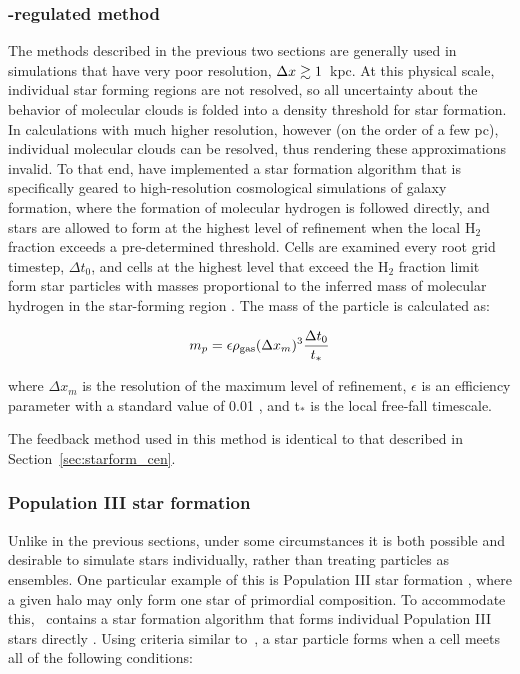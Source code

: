 \subsubsection{\HH-regulated method}
\label{sec:starform_H2reg}

The methods described in the previous two sections are generally used
in simulations that have very poor resolution, $\Delta x \gtrsim 1$~kpc.
At this physical scale, individual star forming regions are not
resolved, so all uncertainty about the behavior of molecular clouds is
folded into a density threshold for star formation.  In calculations
with much higher resolution, however (on the order of a few pc), individual
molecular clouds can be resolved, thus rendering these approximations
invalid.  To that end, \citet{2012ApJ...749...36K} have implemented
a star formation algorithm that is specifically geared to
high-resolution cosmological simulations of galaxy formation, where
the formation of molecular hydrogen is followed directly, and stars
are allowed to form at the highest level of refinement when the local
H$_2$ fraction exceeds a pre-determined threshold.  Cells are examined
every root grid timestep, $\Delta t_0$, and cells at the highest level
that exceed the H$_2$ fraction limit form star particles with masses
proportional to the inferred mass of molecular hydrogen in the
star-forming region
\citep{2008ApJ...689..865K,2009ApJ...693..216K,2010ApJ...709..308M}.
The mass of the particle is calculated as:

\begin{equation} 
m_p = \epsilon \rho_{\rm gas} (\Delta x_{m})^3 \frac{\Delta t_0}{t_*}
\end{equation}

where $\Delta x_{m}$ is the resolution of the maximum level of
refinement, $\epsilon$ is an efficiency parameter with a standard
value of 0.01 \citep[as motivated by][]{2007ApJ...654..304K}, and
t$_*$ is the local free-fall timescale.

The feedback method used in this method is identical to that described
in Section~\ref{sec:starform_cen}.

\subsubsection{Population III star formation}
\label{sec:starform_pop3}

Unlike in the previous sections, under some circumstances it is both
possible and desirable to simulate stars individually, rather than
treating particles as ensembles.  One particular example of this is
Population III star formation
\citep{ABN02,2007ApJ...654...66O,2008ApJ...685...40W,2009Sci...325..601T},
where a given halo may only form one star of primordial composition.
To accommodate this, \enzo\ contains a star formation algorithm that
forms individual Population III stars directly \citep{2007ApJ...659L..87A,
  2008ApJ...685...40W, 2012MNRAS.427..311W}.  Using criteria similar
to~\citet{CO1992}, a star particle forms when a cell meets all of the
following conditions:

